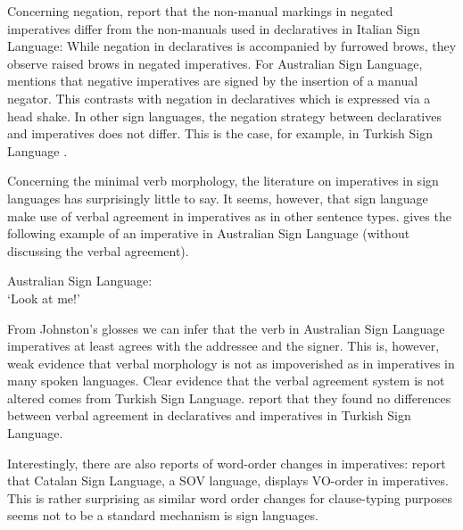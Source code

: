 Concerning negation, \citet{donati2017searching} report that the non-manual markings in negated imperatives differ from the non-manuals used in declaratives in Italian Sign Language: While negation in declaratives is accompanied by furrowed brows, they observe raised brows in negated imperatives. For Australian Sign Language, \citet[v196--197]{johnston1989auslan} mentions that negative imperatives are signed by the insertion of a manual negator. This contrasts with negation in declaratives which is expressed via a head shake. In other sign languages, the negation strategy between declaratives and imperatives does not differ. This is the case, for example, in Turkish Sign Language \citep{ozsoy2014commands}. %

Concerning the minimal verb morphology, the literature on imperatives in sign languages has surprisingly little to say. It seems, however, that sign language make use of verbal agreement in imperatives as in other sentence types.  \citet[195]{johnston1989auslan} gives the following example of an imperative in Australian Sign Language (without discussing the verbal agreement).


\begin{exe}
\ex Australian Sign Language: \\ 
\glt `Look at me!' \label{imperativeauslan}
\end{exe}

\noindent From Johnston's glosses we can infer that the verb in Australian Sign Language imperatives at least agrees with the addressee and the signer. This is, however, weak evidence that verbal morphology is not as impoverished as in imperatives in many spoken languages. Clear evidence that the verbal agreement system is not altered comes from Turkish Sign Language. \citet{ozsoy2014commands} report that they found no differences between verbal agreement in declaratives and imperatives in Turkish Sign Language.

Interestingly, there are also reports of word-order changes in imperatives: \citet{donati2017searching} report that Catalan Sign Language, a SOV language, displays VO-order in imperatives. This is rather surprising as similar word order changes for clause-typing purposes seems not to be a standard mechanism is sign languages. 

